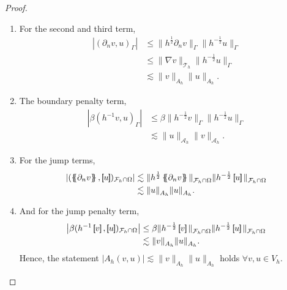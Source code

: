 \begin{proof}
\begin{enumerate}[label=\arabic*)]
\begin{enumerate}
        \item For the second and third term,
            \[
                \begin{split}
                 \left\lvert ( \partial _{n} v,  u)_{\Gamma } \right\rvert & \le \|h^{\frac{1}{2}} \partial _{n}v  \|_{ \Gamma   }^{  } \| h^{-\frac{1}{2}} u  \|_{ \Gamma  }^{  }  \\
                 & \le \| \nabla v \|_{\mathcal{T}_{h}   }^{  } \|h^{-\frac{1}{2}} u \|_{ \Gamma    }^{  } \\
                 & \lesssim   \| v \|_{A_{h}   }^{  } \| u \|_{ A_{h}    }^{  }.
                \end{split}
            \]

        \item The boundary penalty term,
            \[
                \begin{split}
                    \left\lvert\beta ( h^{-1} v,u)_{\Gamma }  \right\rvert  & \le \beta \| h^{-\frac{1}{2}} v \|_{\Gamma   }^{  } \| h^{-\frac{1}{2}} u \|_{\Gamma   }^{  } \\
                                                                            &\lesssim \| u \|_{\mathcal{A}_{h}   }^{  }\| v \|_{\mathcal{A}_{h}   }^{  }.
                \end{split}
            \]

        \item For the jump terms, \[
                \begin{split}
                    \left\lvert( \mean{ \partial _{n} v }  , \jump{ u }  ) _{\mathcal{F} _{h} \cap \Omega }  \right\rvert &\lesssim  \| h^{\frac{1}{2}} \mean{ \partial _{n} v }   \|_{ \mathcal{F}_{h}\cap \Omega   }^{  } \|h^{-\frac{1}{2}} \jump{ u }   \|_{ \mathcal{F}_{h}\cap
                    \Omega   }^{  } \\
&\lesssim  \| u   \|_{ A_{h}    }^{  } \|  u    \|_{ A_{h}   }^{  }.
                \end{split}
        \]

    \item And for the jump penalty term,
        \[
            \begin{split}
         \left\lvert \beta ( h^{-1} \jump{ v }  ,
         \jump{ u }  )_{\mathcal{F}_{h}\cap \Omega  } \right\rvert &\le  \beta \| h^{-\frac{1}{2}    }\jump{ v } \|_{ \mathcal{F}_{h} \cap \Omega  }^{  }\| h^{-\frac{1}{2}    }\jump{ u } \|_{\mathcal{F}_{h} \cap \Omega   }^{  } \\
    &\lesssim \| v \|_{A_{h}  }^{  } \| u \|_{A_{h}  }^{  }.
            \end{split}
        \]
        Hence, the statement $\left\lvert A_{h}( v,u) \right\rvert \lesssim \| v \|_{A_{h}  }^{  }     \| u \|_{A_{h}  }^{  }  $ holds $ \forall v,u \in V_{h} $.
    \end{enumerate}


\end{enumerate}
\end{proof}
